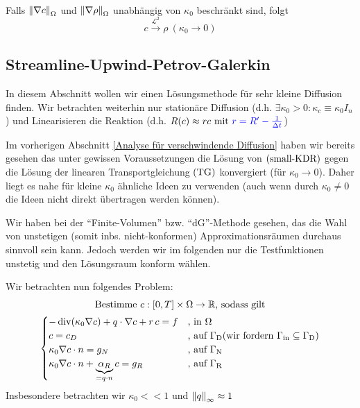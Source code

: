 \begin{Korollar}~
	
	Falls $ \norm{\nabla c}_\Omega $ und $ \norm{\nabla \rho}_\Omega $ unabhängig von $ \kappa_0 $ beschränkt sind, folgt
	\[ c \stackrel{\mathcal{L}^2}{\to} \rho \ (\kappa_0 \to 0) \]
\end{Korollar}

\subsection{Streamline-Upwind-Petrov-Galerkin}
In diesem Abschnitt wollen wir einen Lösungsmethode für sehr kleine Diffusion finden. Wir betrachten weiterhin nur stationäre Diffusion (d.h. $ \exists \kappa_0 > 0: \kappa_c \equiv \kappa_0 I_n $) und Linearisieren die Reaktion (d.h. $ R(c) \approx r c \text{ mit } \textcolor{blue}{r =  R' - \frac{1}{\Delta t}}$)

Im vorherigen Abschnitt \ref{Analyse für verschwindende Diffusion} haben wir bereits gesehen das unter gewissen Voraussetzungen die Lösung von $ \operatorname{(small-KDR)} $ gegen die Lösung der linearen Transportgleichung $ \operatorname{(TG)} $ konvergiert (für $ \kappa_0 \to 0 $). Daher liegt es nahe für kleine $ \kappa_0  $ ähnliche Ideen zu verwenden (auch wenn durch $ \kappa_0 \neq 0 $ die Ideen nicht direkt übertragen werden können).

Wir haben bei der \enquote{Finite-Volumen} bzw. \enquote{dG}-Methode gesehen, das die Wahl von unstetigen (somit inbs. nicht-konformen) Approximationsräumen durchaus sinnvoll sein kann. Jedoch werden wir im folgenden nur die Testfunktionen unstetig und den Lösungsraum konform wählen.

Wir betrachten nun folgendes Problem:
\begin{gather*}
	\text{Bestimme } c:[0,T] \times \Omega \to \mathbb{R} \text{, sodass gilt}\\
	\begin{cases}
		- \operatorname{div}(\kappa_0 \nabla c) + q \cdot \nabla c + r \, c = f &\text{, in } \Omega\\
		c = c_D &\text{, auf } \Gamma_{\text{D}} (\text{wir fordern } \Gamma_{{\text{in}}} \subseteq \Gamma_{\text{D}})\\
		\kappa_0 \nabla c \cdot n = g_N &\text{, auf } \Gamma_{\text{N}}\\
		\kappa_0 \nabla c \cdot n  + \underbrace{\alpha_R}_{= q \cdot n} c = g_R &\text{, auf } \Gamma_{\text{R}}
	\end{cases}
\end{gather*}
Insbesondere betrachten wir $ \kappa_0 << 1 $ und $ \norm{q}_\infty \approx 1 $

